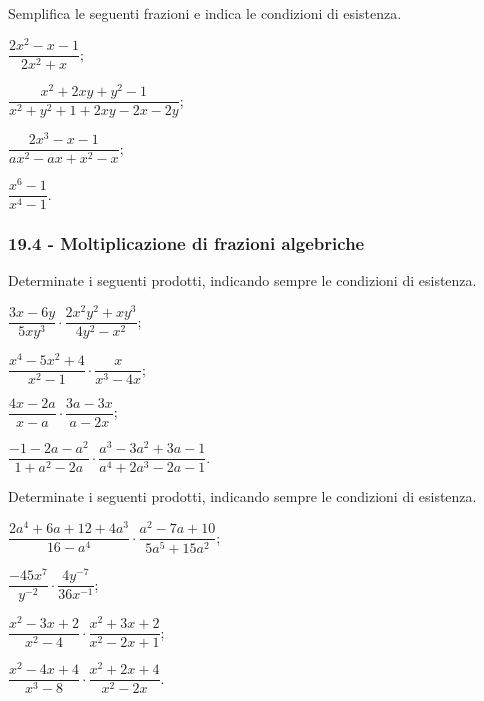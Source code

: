 \begin{esercizio}[\Ast]
\label{ese:19.12}
Semplifica le seguenti frazioni e indica le condizioni di esistenza.
\begin{multicols}{2}
\begin{enumeratea}
 \item $\dfrac{2x^{2}-x-1}{2x^{2}+x}$;
 \item $\dfrac{x^{2}+2xy+y^{2}-1}{x^{2}+y^{2}+1+2xy-2x-2y}$;
 \item $\dfrac{2x^{3}-x-1}{ax^{2}-ax+x^{2}-x}$;
 \item $\dfrac{x^{6}-1}{x^{4}-1}$.
\end{enumeratea}
\end{multicols}
\end{esercizio}

\subsubsection*{19.4 - Moltiplicazione di frazioni algebriche}

\begin{esercizio}[\Ast]
\label{ese:19.13}
Determinate i seguenti prodotti, indicando sempre le condizioni di esistenza.
\begin{multicols}{2}
\begin{enumeratea}
 \item $\dfrac{3x-6y}{5xy^{3}}\cdot\dfrac{2x^{2}y^{2}+xy^{3}}{4y^{2}-x^{2}}$;
 \item $\dfrac{x^{4}-5x^{2}+4}{x^{2}-1}\cdot\dfrac{x}{x^{3}-4x}$;
 \item $\dfrac{4x-2a}{x-a}\cdot\dfrac{3a-3x}{a-2x}$;
 \item $\dfrac{-1-2a-a^{2}}{1+a^{2}-2a}\cdot\dfrac{a^{3}-3a^{2}+3a-1}{a^{4}+2a^{3}-2a-1}$.
\end{enumeratea}
\end{multicols}
\end{esercizio}

\begin{esercizio}[\Ast]
\label{ese:19.14}
Determinate i seguenti prodotti, indicando sempre le condizioni di esistenza.
\begin{multicols}{2}
\begin{enumeratea}
 \item $\dfrac{2a^{4}+6a+12+4a^{3}}{16-a^{4}}\cdot\dfrac{a^{2}-7a+10}{5a^{5}+15a^{2}}$;
 \item $\dfrac{-45x^{7}}{y^{-2}}\cdot\dfrac{4y^{-7}}{36x^{-1}}$;
 \item $\dfrac{x^{2}-3x+2}{x^{2}-4}\cdot\dfrac{x^{2}+3x+2}{x^{2}-2x+1}$;
 \item $\dfrac{x^{2}-4x+4}{x^{3}-8}\cdot\dfrac{x^{2}+2x+4}{x^{2}-2x}$.
\end{enumeratea}
\end{multicols}
\end{esercizio}

